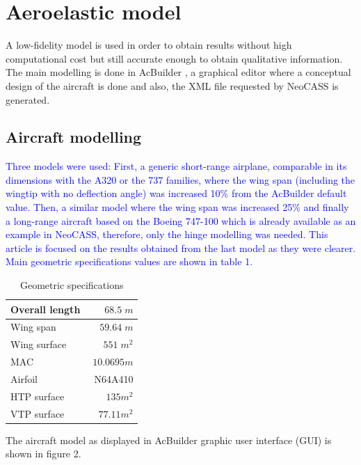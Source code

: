 \documentclass[conference]{IEEEtran}
\begin{document}
\section{Aeroelastic model}
\label{sec:aeroelastic-model}
A low-fidelity model is used in order to obtain results without high computational cost but still accurate enough to obtain qualitative information. The main modelling is done in AcBuilder \cite{acbuilderfurther}, a graphical editor where a conceptual design of the aircraft is done and also, the XML file requested by NeoCASS is generated.

\subsection{Aircraft modelling}
\textcolor{blue}{Three models were used: First, a generic short-range airplane, comparable in its dimensions with the A320 or the 737 families, where the wing span (including the wingtip with no deflection angle) was increased 10\% from the AcBuilder default value. Then, a similar model where the wing span was increased 25\% and finally a long-range aircraft based on the Boeing 747-100 which is already available as an example in NeoCASS, therefore, only the hinge modelling was needed. This article is focused on the results obtained from the last model as they were clearer. Main geometric specifications values are shown in table 1.}

\begin{table}[t]
\begin{center}
\begin{tabular}{| l | r |}
\hline
Overall length & $68.5 \; m$ \\ \hline
Wing span & $59.64 \;m$ \\ \hline
Wing surface & $551 \;m^2$ \\\hline
MAC & $ \;10.0695 m$\\\hline
Airfoil &  N64A410\\ \hline
HTP surface & $135 m^2$\\\hline
VTP surface & $77.11 m^2$\\
\hline 
\end{tabular}
\caption{Geometric specifications}
\label{tab:fruta}
\end{center}
\end{table}

The aircraft model as displayed in AcBuilder graphic user interface (GUI) is shown in figure 2.
\end{document}
